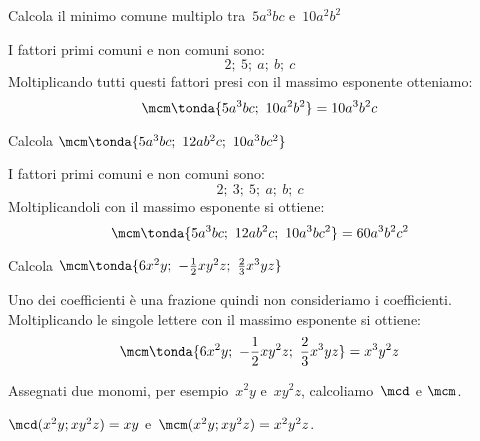 \begin{exrig}
 \begin{esempio}
Calcola il minimo comune multiplo tra~$5a^{3}bc$ e~$10a^{2}b^{2}$ 

I fattori primi comuni e non comuni sono:
\[2;~5;~a;~b;~c\]
Moltiplicando tutti questi fattori presi con il massimo esponente otteniamo:
\[\mcm\tonda{5a^{3}bc;~10a^{2}b^{2}} = 10a^{3}b^{2}c\]
 \end{esempio}
% 
% 
% 
% 
 \begin{esempio}
Calcola \(\mcm \tonda{5a^{3}bc;~12ab^{2}c;~10a^{3}bc^{2}}\)

I fattori primi comuni e non comuni sono:
\[2;~3;~5;~a;~b;~c\]
Moltiplicandoli con il massimo esponente si ottiene:
\[\mcm \tonda{5a^{3}bc;~12ab^{2}c;~10a^{3}bc^{2}} = 60a^{3}b^{2}c^{2}\]
 \end{esempio}

 \begin{esempio}
Calcola \(\mcm \tonda{6x^{2}y;~-\frac{1}{2}xy^{2}z;~\frac{2}{3}x^{3}yz}\)

Uno dei coefficienti è una frazione quindi non consideriamo i coefficienti.
Moltiplicando le singole lettere con il massimo esponente si ottiene:
\[\mcm \tonda{6x^{2}y;~-\frac{1}{2}xy^{2}z;~\frac{2}{3}x^{3}yz} = 
x^{3}y^{2}z\]
 \end{esempio}
\end{exrig}

Assegnati due monomi, per esempio~$x^{2}y$ e~$xy^{2}z$,
calcoliamo~$\mcd$ e $\mcm$.

$\mcd (x^{2}y;xy^{2}z)=xy$ e~$\mcm (x^{2}y;xy^{2}z)=x^{2}y^{2}z$.

